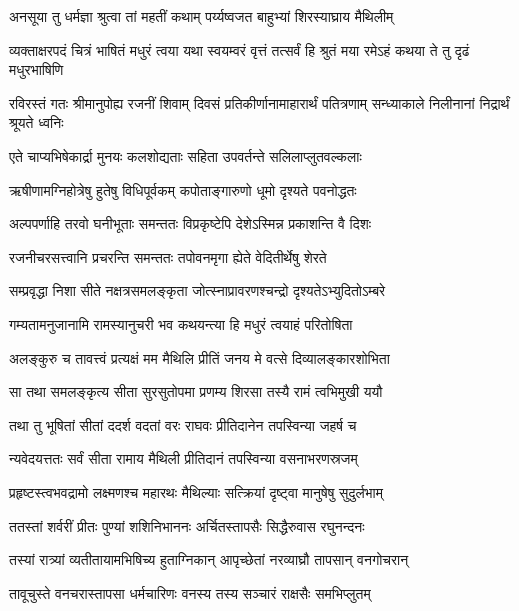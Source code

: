 
\twolineshloka
{अनसूया तु धर्मज्ञा श्रुत्वा तां महतीं कथाम्}
{पर्य्यष्वजत बाहुभ्यां शिरस्याघ्राय मैथिलीम्} %

\threelineshloka
{व्यक्ताक्षरपदं चित्रं भाषितं मधुरं त्वया}
{यथा स्वयम्वरं वृत्तं तत्सर्वं हि श्रुतं मया}
{रमेऽहं कथया ते तु दृढं मधुरभाषिणि} %

\threelineshloka
{रविरस्तं गतः श्रीमानुपोह्य रजनीं शिवाम्}
{दिवसं प्रतिकीर्णानामाहारार्थं पतित्रणाम्}
{सन्ध्याकाले निलीनानां निद्रार्थं श्रूयते ध्वनिः} %

\twolineshloka
{एते चाप्यभिषेकार्द्रा मुनयः कलशोद्यताः}
{सहिता उपवर्तन्ते सलिलाप्लुतवल्कलाः} %

\twolineshloka
{ऋषीणामग्निहोत्रेषु हुतेषु विधिपूर्वकम्}
{कपोताङ्गारुणो धूमो दृश्यते पवनोद्धतः} %

\twolineshloka
{अल्पपर्णाहि तरवो घनीभूताः समन्ततः}
{विप्रकृष्टेपि देशेऽस्मिन्न प्रकाशन्ति वै दिशः} %

\twolineshloka
{रजनीचरसत्त्वानि प्रचरन्ति समन्ततः}
{तपोवनमृगा ह्येते वेदितीर्थेषु शेरते} %

\twolineshloka
{सम्प्रवृद्धा निशा सीते नक्षत्रसमलङ्कृता}
{जोत्स्नाप्रावरणश्चन्द्रो दृश्यतेऽभ्युदितोऽम्बरे} %

\twolineshloka
{गम्यतामनुजानामि रामस्यानुचरी भव}
{कथयन्त्या हि मधुरं त्वयाहं परितोषिता} %

\twolineshloka
{अलङ्कुरु च तावत्त्वं प्रत्यक्षं मम मैथिलि}
{प्रीतिं जनय मे वत्से दिव्यालङ्कारशोभिता} %

\twolineshloka
{सा तथा समलङ्कृत्य सीता सुरसुतोपमा}
{प्रणम्य शिरसा तस्यै रामं त्वभिमुखी ययौ} %

\twolineshloka
{तथा तु भूषितां सीतां ददर्श वदतां वरः}
{राघवः प्रीतिदानेन तपस्विन्या जहर्ष च} %

\twolineshloka
{न्यवेदयत्ततः सर्वं सीता रामाय मैथिली}
{प्रीतिदानं तपस्विन्या वसनाभरणस्रजम्} %

\twolineshloka
{प्रहृष्टस्त्वभवद्रामो लक्ष्मणश्च महारथः}
{मैथिल्याः सत्क्रियां दृष्ट्वा मानुषेषु सुदुर्लभाम्} %

\twolineshloka
{ततस्तां शर्वरीं प्रीतः पुण्यां शशिनिभाननः}
{अर्चितस्तापसैः सिद्धैरुवास रघुनन्दनः} %

\twolineshloka
{तस्यां रात्र्यां व्यतीतायामभिषिच्य हुताग्निकान्}
{आपृच्छेतां नरव्याघ्रौ तापसान् वनगोचरान्} %

\twolineshloka
{तावूचुस्ते वनचरास्तापसा धर्मचारिणः}
{वनस्य तस्य सञ्चारं राक्षसैः समभिप्लुतम्} %


